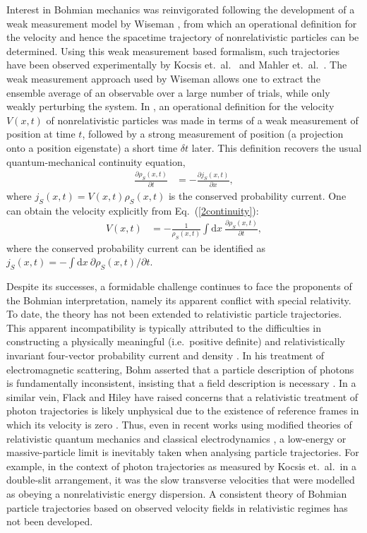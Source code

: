\documentclass[
prx
,twocolumn
,nofootinbib
,floatfix
,superscriptaddress
]{revtex4-2}
\newcommand{\p}{\partial}
\newcommand{\D}{\mathrm{d}}
\begin{document}
Interest in Bohmian mechanics was reinvigorated following the development of a weak measurement model by Wiseman \cite{Wiseman_2007}, from which an operational definition for the velocity and hence the spacetime trajectory of nonrelativistic particles can be determined. Using this weak measurement based formalism, such trajectories have been observed experimentally by Kocsis et.\ al.\  \cite{kocsis2011observing} and Mahler et.\ al.\ \cite{mahler2016experimental}. The weak measurement approach used by Wiseman allows one to extract the ensemble average of an observable over a large number of trials, while only weakly perturbing the system. In \cite{Wiseman_2007}, an operational definition for the velocity $V(x,t)$ of nonrelativistic particles was made in terms of a weak measurement of position at time $t$, followed by a strong measurement of position (a projection onto a position eigenstate) a short time $\delta t$ later. This definition recovers the usual quantum-mechanical continuity equation, 
\begin{align}\label{2continuity}
    \frac{\p \rho_S(x,t)}{\p t} &= - \frac{\p j_S(x,t) }{\p x} ,
\end{align}
where $j_S(x,t) = V(x,t) \rho_S(x,t)$ is the conserved probability current. One can obtain the velocity explicitly from Eq.\ (\ref{2continuity}):
\begin{align}\label{3velocity}
    V(x,t) &= - \frac{1}{\rho_S(x,t)} \int\D x \: \frac{\p \rho_S(x,t)}{\p t}, 
\end{align}
where the conserved probability current can be identified as $j_S(x,t) = - \int\D x \: \p \rho_S(x,t)/\p t$. 

Despite its successes, a formidable challenge continues to face the proponents of the Bohmian interpretation, namely its apparent conflict with special relativity. To date, the theory has not been extended to relativistic particle trajectories. This apparent incompatibility is typically attributed to the difficulties in constructing a physically meaningful (i.e.\ positive definite) and relativistically invariant four-vector probability current and density \cite{BOHM1987321,Struyve:2004xd}. In his treatment of electromagnetic scattering, Bohm asserted that a particle description of photons is fundamentally inconsistent, insisting that a field description is necessary \cite{BOHM1987321}. In a similar vein, Flack and Hiley have raised concerns that a relativistic treatment of photon trajectories is likely unphysical due to the existence of reference frames in which its velocity is zero \cite{flack_hiley_2015}. Thus, even in recent works using modified theories of relativistic quantum mechanics \cite{Ghose_2001,Jalalzadeh_2019} and classical electrodynamics \cite{Davidovi__2009,SANZ2010763}, a low-energy or massive-particle limit is inevitably taken when analysing particle trajectories. For example, in the context of photon trajectories as measured by Kocsis et.\ al.\ in a double-slit arrangement, it was the slow transverse velocities that were modelled as obeying a nonrelativistic energy dispersion. A consistent theory of Bohmian particle trajectories based on observed velocity fields in relativistic regimes has not been developed. 
\end{document}
